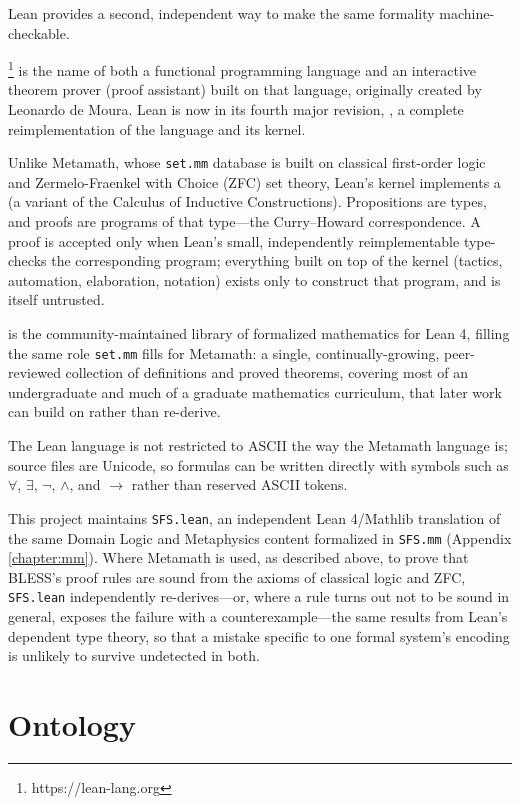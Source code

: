 \pn Lean provides a second, independent way to make the same formality machine-checkable.

\pn {}\footnote{https://lean-lang.org} is the name of both a functional programming language and an interactive theorem prover (proof assistant) built on that language, originally created by Leonardo de Moura.  Lean is now in its fourth major revision, , a complete reimplementation of the language and its kernel.

\pn Unlike Metamath, whose \texttt{set.mm} database is built on classical first-order logic and Zermelo-Fraenkel with Choice (ZFC) set theory, Lean's kernel implements a  (a variant of the Calculus of Inductive Constructions).  Propositions are types, and proofs are programs of that type---the Curry--Howard correspondence.  A proof is accepted only when Lean's small, independently reimplementable  type-checks the corresponding program; everything built on top of the kernel (tactics, automation, elaboration, notation) exists only to construct that program, and is itself untrusted.

\pn {} is the community-maintained library of formalized mathematics for Lean 4, filling the same role \texttt{set.mm} fills for Metamath: a single, continually-growing, peer-reviewed collection of definitions and proved theorems, covering most of an undergraduate and much of a graduate mathematics curriculum, that later work can build on rather than re-derive.

\pn The Lean language is not restricted to ASCII the way the Metamath language is; source files are Unicode, so formulas can be written directly with symbols such as $\forall$, $\exists$, $\neg$, $\wedge$, and $\rightarrow$ rather than reserved ASCII tokens.

\pn This project maintains \texttt{SFS.lean}, an independent Lean 4/Mathlib translation of the same Domain Logic and Metaphysics content formalized in \texttt{SFS.mm} (Appendix \ref{chapter:mm}).  Where Metamath is used, as described above, to prove that BLESS's proof rules are sound from the axioms of classical logic and ZFC, \texttt{SFS.lean} independently re-derives---or, where a rule turns out not to be sound in general, exposes the failure with a counterexample---the same results from Lean's dependent type theory, so that a mistake specific to one formal system's encoding is unlikely to survive undetected in both.

\section{Ontology}\label{sec:ontology}
 

